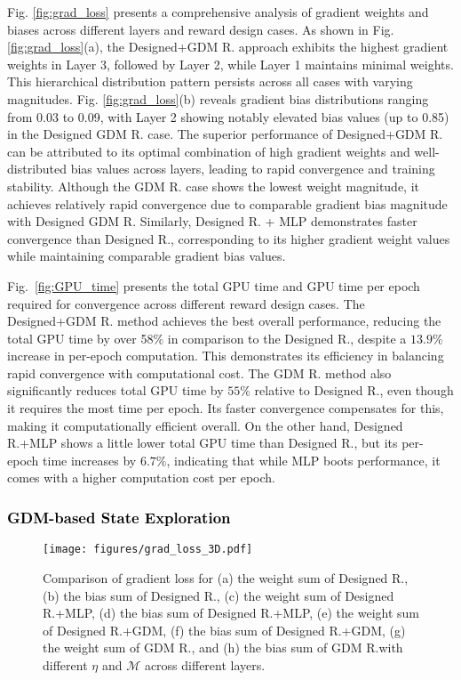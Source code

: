 \documentclass[comsoc,journal]{IEEEtran}
\begin{document}
Fig. \ref{fig:grad_loss} presents a comprehensive analysis of gradient weights and biases across different layers and reward design cases. As shown in Fig. \ref{fig:grad_loss}(a), the Designed+GDM R. approach exhibits the highest gradient weights in Layer 3, followed by Layer 2, while Layer 1 maintains minimal weights. This hierarchical distribution pattern persists across all cases with varying magnitudes. Fig. \ref{fig:grad_loss}(b) reveals gradient bias distributions ranging from 0.03 to 0.09, with Layer 2 showing notably elevated bias values (up to 0.85) in the Designed GDM R. case.
The superior performance of Designed+GDM R. can be attributed to its optimal combination of high gradient weights and well-distributed bias values across layers, leading to rapid convergence and training stability. Although the GDM R. case shows the lowest weight magnitude, it achieves relatively rapid convergence due to comparable gradient bias magnitude with Designed GDM R. Similarly, Designed R. + MLP demonstrates faster convergence than Designed R., corresponding to its higher gradient weight values while maintaining comparable gradient bias values.

Fig.~\ref{fig:GPU_time} presents the total GPU time and GPU time per epoch required for convergence across different reward design cases. The Designed+GDM R. method achieves the best overall performance, reducing the total GPU time by over 58$\%$ in comparison to the Designed R., despite a $13.9\%$ increase in per-epoch computation. This demonstrates its efficiency in balancing rapid convergence with computational cost. The GDM R. method also significantly reduces total GPU time by $55\%$ relative to Designed R., even though it requires the most time per epoch. Its faster convergence compensates for this, making it computationally efficient overall. On the other hand, Designed R.+MLP shows a little lower total GPU time than Designed R., but its per-epoch time increases by $6.7\%$, indicating that while MLP boots performance, it comes with a higher computation cost per epoch.

\subsubsection{ \textcolor{black}{GDM-based State Exploration}}


\begin{figure*}[t]
    \centering
    \texttt{[image: figures/grad\_loss\_3D.pdf]}
    \caption{Comparison of gradient loss for (a) the weight sum of Designed R., (b) the bias sum of Designed R., (c) the weight sum of Designed R.+MLP, (d) the bias sum of Designed R.+MLP, (e) the weight sum of Designed R.+GDM, (f) the bias sum of Designed R.+GDM, (g) the weight sum of GDM R., and (h) the bias sum of GDM R.with different $\eta$ and $\mathcal{M}$ across different layers.
   }  
    \label{fig:State_exp_grad}
    \vspace{-6pt}
\end{figure*}
\end{document}
